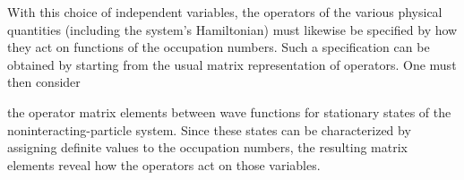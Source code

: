With this choice of independent variables, the operators of the various
physical quantities (including the system's Hamiltonian) must likewise be
specified by how they act on functions of the occupation numbers. Such a
specification can be obtained by starting from the usual matrix representation
of operators. One must then consider

the operator matrix elements between wave functions for stationary states of
the noninteracting-particle system. Since these states can be characterized by
assigning definite values to the occupation numbers, the resulting matrix
elements reveal how the operators act on those variables.
